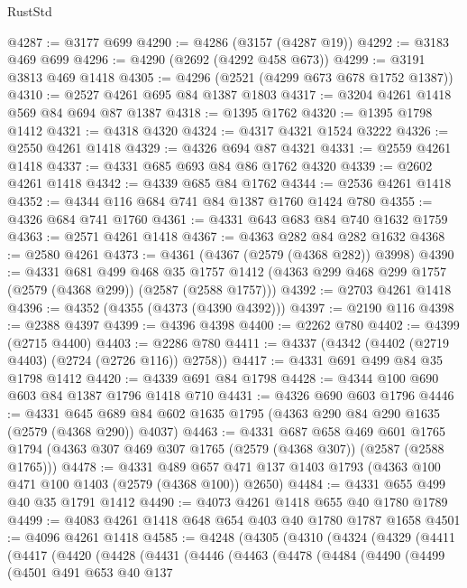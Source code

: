 \begin{lexlean}{RustStd}
\begin{coremodule}
@4287 := @3177 @699
@4290 := @4286 (@3157 (@4287 @19))
@4292 := @3183 @469 @699
@4296 := @4290 (@2692 (@4292 @458 @673))
@4299 := @3191 @3813 @469 @1418
@4305 := @4296 (@2521 (@4299 @673 @678 @1752 @1387))
@4310 := @2527 @4261 @695 @84 @1387 @1803
@4317 := @3204 @4261 @1418 @569 @84 @694 @87 @1387
@4318 := @1395 @1762
@4320 := @1395 @1798 @1412
@4321 := @4318 @4320
@4324 := @4317 @4321 @1524 @3222
@4326 := @2550 @4261 @1418
@4329 := @4326 @694 @87 @4321
@4331 := @2559 @4261 @1418
@4337 := @4331 @685 @693 @84 @86 @1762 @4320
@4339 := @2602 @4261 @1418
@4342 := @4339 @685 @84 @1762
@4344 := @2536 @4261 @1418
@4352 := @4344 @116 @684 @741 @84 @1387 @1760 @1424 @780
@4355 := @4326 @684 @741 @1760
@4361 := @4331 @643 @683 @84 @740 @1632 @1759
@4363 := @2571 @4261 @1418
@4367 := @4363 @282 @84 @282 @1632
@4368 := @2580 @4261
@4373 := @4361 (@4367 (@2579 (@4368 @282)) @3998)
@4390 := @4331
    @681
    @499
    @468
    @35
    @1757
    @1412
    (@4363 @299 @468 @299 @1757 (@2579 (@4368 @299)) (@2587 (@2588 @1757)))
@4392 := @2703 @4261 @1418
@4396 := @4352 (@4355 (@4373 (@4390 @4392)))
@4397 := @2190 @116
@4398 := @2388 @4397
@4399 := @4396 @4398
@4400 := @2262 @780
@4402 := @4399 (@2715 @4400)
@4403 := @2286 @780
@4411 := @4337 (@4342 (@4402 (@2719 @4403) (@2724 (@2726 @116)) @2758))
@4417 := @4331 @691 @499 @84 @35 @1798 @1412
@4420 := @4339 @691 @84 @1798
@4428 := @4344 @100 @690 @603 @84 @1387 @1796 @1418 @710
@4431 := @4326 @690 @603 @1796
@4446 := @4331 @645 @689 @84 @602 @1635 @1795 (@4363 @290 @84 @290 @1635 (@2579 (@4368 @290)) @4037)
@4463 := @4331
    @687
    @658
    @469
    @601
    @1765
    @1794
    (@4363 @307 @469 @307 @1765 (@2579 (@4368 @307)) (@2587 (@2588 @1765)))
@4478 := @4331
    @489
    @657
    @471
    @137
    @1403
    @1793
    (@4363 @100 @471 @100 @1403 (@2579 (@4368 @100)) @2650)
@4484 := @4331 @655 @499 @40 @35 @1791 @1412
@4490 := @4073 @4261 @1418 @655 @40 @1780 @1789
@4499 := @4083 @4261 @1418 @648 @654 @403 @40 @1780 @1787 @1658
@4501 := @4096 @4261 @1418
@4585 := @4248
    (@4305
      (@4310
        (@4324
          (@4329
            (@4411
              (@4417
                (@4420
                  (@4428
                    (@4431
                      (@4446
                        (@4463
                          (@4478
                            (@4484
                              (@4490
                                (@4499
                                  (@4501
                                    @491
                                    @653
                                    @40
                                    @137

\end{coremodule}
\end{lexlean}
